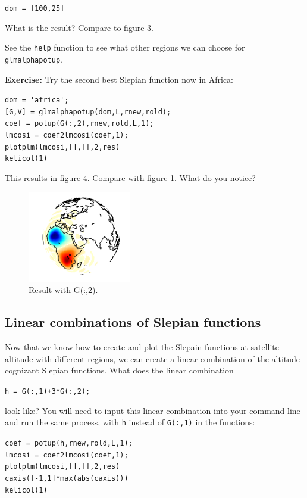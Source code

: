 \documentclass[11pt]{article}
\begin{document}
\verb+dom = [100,25]+

What is the result? Compare to figure 3.

See the \verb+help+ function to see what other regions we can choose for \verb+glmalphapotup+.

\textbf{Exercise:} Try the second best Slepian function now in Africa:

\verb+dom = 'africa';+\\
\verb+[G,V] = glmalphapotup(dom,L,rnew,rold);+\\
\verb+coef = potup(G(:,2),rnew,rold,L,1);+\\
\verb+lmcosi = coef2lmcosi(coef,1);+\\
\verb+plotplm(lmcosi,[],[],2,res)+\\
\verb+kelicol(1)+

This results in figure 4.  Compare with figure 1.  What do you notice?

\begin{figure}
  \centering
  \includegraphics[width=0.4\textwidth]{figures/G(:,2).png}
  \caption{Result with G(:,2).}
\label{G(:,2)}
\end{figure}

\subsection{Linear combinations of Slepian functions}

Now that we know how to create and plot the Slepain functions at satellite altitude with different regions, we can create a linear combination of the altitude-cognizant Slepian functions.  What does the linear combination 

\verb|h = G(:,1)+3*G(:,2);| 

look like?  You will need to input this linear combination into your command line and run the same process, with \verb+h+ instead of \verb+G(:,1)+ in the functions:

\verb+coef = potup(h,rnew,rold,L,1);+\\
\verb+lmcosi = coef2lmcosi(coef,1);+\\
\verb+plotplm(lmcosi,[],[],2,res)+\\
\verb+caxis([-1,1]*max(abs(caxis)))+\\
\verb+kelicol(1)+
\end{document}
